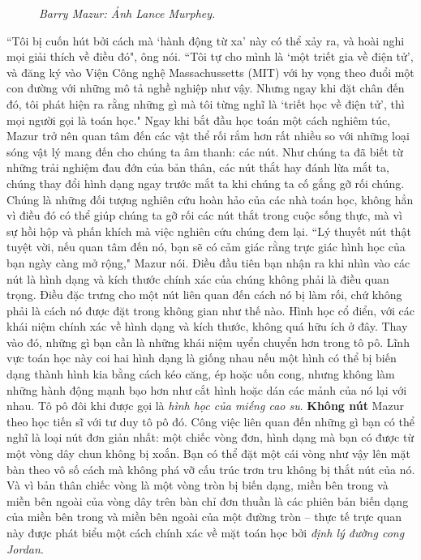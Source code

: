 \begin{multicols}{2}
\begin{figure}[H]
		\caption{\small\textit{\color{duongvaotoanhoc}Barry Mazur: Ảnh Lance Murphey.}}
		\vspace*{-10pt}
	\end{figure}
	``Tôi bị cuốn hút bởi cách mà `hành động từ xa' này có thể xảy ra, và hoài nghi mọi giải thích về điều đó", ông nói. ``Tôi tự cho mình là `một triết gia về điện tử', và đăng ký vào Viện Công nghệ Massachussetts (MIT) với hy vọng theo đuổi một con đường với những mô tả nghề nghiệp như vậy. Nhưng ngay khi đặt chân đến đó, tôi phát hiện ra rằng những gì mà tôi từng nghĩ là `triết học về điện tử', thì mọi người gọi là toán học."
	\vskip 0.05cm
	Ngay khi bắt đầu học toán một cách nghiêm túc, Mazur trở nên quan tâm đến các vật thể rối rắm  hơn rất nhiều so với những loại sóng vật lý mang đến cho chúng ta âm thanh: các nút. Như chúng ta đã biết từ những trải nghiệm đau đớn của bản thân, các nút thắt hay đánh lừa mắt ta, chúng thay đổi hình dạng ngay trước mắt ta khi chúng ta cố gắng gỡ rối chúng. Chúng là những đối tượng nghiên cứu hoàn hảo của các nhà toán học, không hẳn vì điều đó có thể giúp chúng ta gỡ rối các nút thắt trong cuộc sống thực, mà vì sự hồi hộp và phấn khích mà việc nghiên cứu chúng đem lại. ``Lý thuyết nút thật tuyệt vời, nếu quan tâm đến nó, bạn sẽ có cảm giác rằng trực giác hình học của bạn ngày càng mở rộng," Mazur nói.
	\vskip 0.05cm
	Điều đầu tiên bạn nhận ra khi nhìn vào các nút là hình dạng và kích thước chính xác của chúng không phải là điều quan trọng. Điều đặc trưng cho một nút liên quan đến cách nó bị làm rối, chứ không phải là cách nó được đặt trong không gian như thế nào. Hình học cổ điển, với các khái niệm chính xác về hình dạng và kích thước, không quá hữu ích ở đây. Thay vào đó, những gì bạn cần là những khái niệm uyển chuyển hơn trong tô pô. Lĩnh vực toán học này coi hai hình dạng là giống nhau nếu một hình có thể bị biến dạng thành hình kia bằng cách kéo căng, ép hoặc uốn cong, nhưng không làm những hành động mạnh bạo hơn như cắt hình hoặc dán các mảnh của nó lại với nhau. Tô pô đôi khi được gọi là \textit{hình học của miếng cao su}.
	\vskip 0.05cm
	\textbf{\color{duongvaotoanhoc}Không nút}
	\vskip 0.05cm
	Mazur theo học tiến sĩ với tư duy tô pô đó. Công việc liên quan đến những gì bạn có thể nghĩ là loại nút đơn giản nhất: một chiếc vòng đơn, hình dạng mà bạn có được từ một vòng dây chun không bị xoắn. Bạn có thể đặt một cái vòng như vậy lên mặt bàn theo vô số cách mà không phá vỡ cấu trúc trơn tru không bị thắt nút của nó. Và vì bản thân chiếc vòng là một vòng tròn bị biến dạng, miền bên trong và miền bên ngoài của vòng dây trên bàn chỉ đơn thuần là các phiên bản biến dạng của miền bên trong và miền bên ngoài của một đường tròn -- thực tế trực quan này được phát biểu một cách chính xác về mặt toán học bởi \textit{định lý đường cong Jordan}.

\end{multicols}
